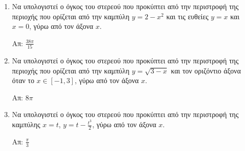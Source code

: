 \documentclass[a4paper,table]{report}
\begin{document}
\begin{enumerate}
   \item  Να υπολογιστεί ο όγκος του στερεού που προκύπτει από την περιστροφή της περιοχής που ορίζεται από την καμπύλη $y=2-x^{2}$ και τις ευθείες $y=x$ και $x=0$, γύρω από τον άξονα $x$.

   \hfill Απ: $\frac{38\pi}{15}$

   \item  Να υπολογιστεί ο όγκος του στερεού που προκύπτει από την περιστροφή της περιοχής που ορίζεται από την καμπύλη $y=\sqrt{3-x}$ και τον οριζόντιο άξονα όταν το $x\in [-1,3]$, γύρω από τον άξονα $x$.

   \hfill Απ: $8\pi$

   \item Να υπολογιστεί ο όγκος του στερεού που προκύπτει από την περιστροφή της καμπύλης $x=t$, $y=t-\frac{t^{3}}{2}$, γύρω από τον άξονα $x$.

   \hfill Απ: $\frac{\pi}{3}$





\end{enumerate}
\end{document}
